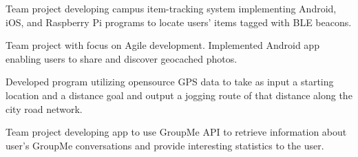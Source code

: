 \documentclass[11pt,letterpaper,serif]{moderncv}
\begin{document}
{
	\begin{adjustwidth}{.25in}{}
		Team project developing campus item-tracking system implementing Android, iOS, and Raspberry Pi programs to locate users' items tagged with BLE beacons.
	\end{adjustwidth}
}

{
	\begin{adjustwidth}{.25in}{}
		Team project with focus on Agile development. Implemented Android app enabling users to share and discover geocached photos.
	\end{adjustwidth}
}

{
	\begin{adjustwidth}{.25in}{}
		Developed program utilizing opensource GPS data to take as input a starting location and a distance goal and output a jogging route of that distance along the city road network.
	\end{adjustwidth}
}

{
	\begin{adjustwidth}{.25in}{}
		Team project developing app to use GroupMe API to retrieve information about user's GroupMe conversations and provide interesting statistics to the user.
	\end{adjustwidth}
}
\end{document}
